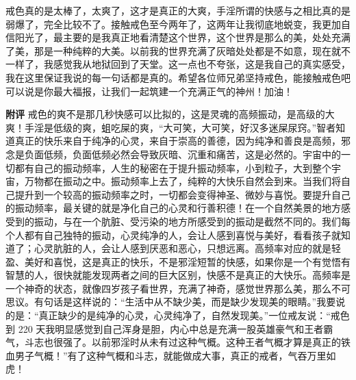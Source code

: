 \begin{case}
    戒色真的是太棒了，太爽了，这才是真正的大爽，手淫所谓的快感与之相比真的是弱爆了，完全比较不了。接触戒色至今两年了，这两年让我彻底地蜕变，我更加自信阳光了，最主要的是我真正地看清楚这个世界，这个世界是那么的美，处处充满了美，那是一种纯粹的大美。以前我的世界充满了灰暗处处都是不如意，现在就不一样了，我感觉我从地狱回到了天堂。这一点也不夸张，这是我自己的真实感受，我在这里保证我说的每一句话都是真的。希望各位师兄弟坚持戒色，能接触戒色吧可以说是你最大福报，让我们一起筑建一个充满正气的神州！加油！

    \textbf{附评} 戒色的爽不是那几秒快感可以比拟的，这是灵魂的高频振动，是高级的大爽！手淫是低级的爽，蛆吃屎的爽，“大可笑，大可笑，好汉多迷屎尿窍。”智者知道真正的快乐来自于纯净的心灵，来自于崇高的善德，因为纯净和善良是高频，邪念是负面低频，负面低频必然会导致灰暗、沉重和痛苦，这是必然的。宇宙中的一切都有自己的振动频率，人生的秘密在于提升振动频率，小到粒子，大到整个宇宙，万物都在振动之中。振动频率上去了，纯粹的大快乐自然会到来。当我们将自己提升到一个较高的振动频率之时，一切都会变得神圣、微妙与喜悦。要提升自己的振动频率，最关键的就是净化自己的心灵和行善积德！在一个自然美景的地方感受到的振动，与在一个肮脏、受污染的地方所感受到的振动是截然不同的。我们每个人都有自己独特的振动，心灵纯净的人，会让人感到喜悦与美好，看看孩子就知道了；心灵肮脏的人，会让人感到厌恶和恶心，只想远离。高频率对应的就是轻盈、美好和喜悦，这是真正的快乐，不是邪淫短暂的快感，如果你是一个有觉悟有智慧的人，很快就能发现两者之间的巨大区别，快感不是真正的大快乐。高频率是一个神奇的状态，就像四岁孩子看世界，充满了神奇，感觉世界那么美，那么不可思议。有句话是这样说的：“生活中从不缺少美，而是缺少发现美的眼睛。”我要说的是：“真正缺少的是纯净的心灵，心灵纯净了，自然发现美。”一位戒友说：“戒色到 220 天我明显感觉到自己浑身是胆，内心中总是充满一股英雄豪气和王者霸气，斗志也很强了。以前邪淫时从未有过这种气概。这种王者气概才算是真正的铁血男子气概！”有了这种气概和斗志，就能做成大事，真正的戒者，气吞万里如虎！


\end{case}
